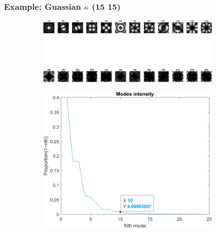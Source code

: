 \documentclass[UTF8]{beamer}
\begin{document}
\begin{frame} \frametitle{Example: Guassian $\kappa$ (15 15)}
\begin{figure}[H]
\centering
\begin{subfigure}{1\textwidth}
    \centering
    \includegraphics[width=0.8\linewidth]{../figures/ex_gu15_15.png}  
    \label{fig:modes_u}
 \end{subfigure}
 \begin{subfigure}{1\textwidth}
    \centering
    \includegraphics[width=.4\linewidth]{../figures/ex_gu15_15_s.png}  
    \label{fig:modes_u_phaze}
 \end{subfigure}
 
    \label{fig:modes_images}

 \end{figure}
\end{frame}
\end{document}
